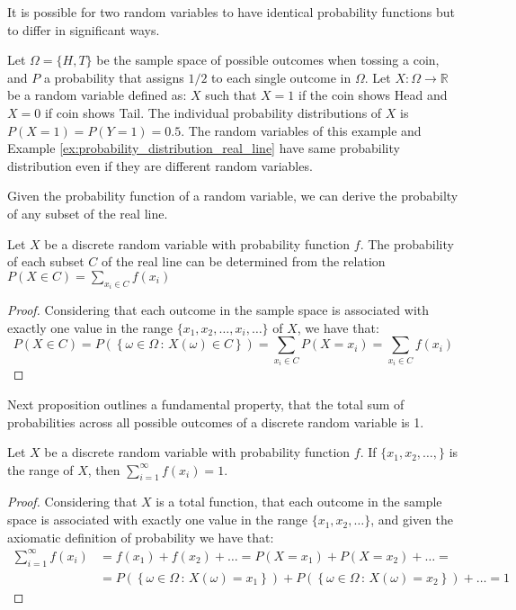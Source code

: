 It is possible for two random variables to have identical probability functions but to differ in significant ways.

\begin{example}
Let $\Omega = \{H, T\}$ be the sample space of possible outcomes when tossing a coin, and $P$ a probability that assigns $1/2$ to each single outcome in $\Omega$. Let $X: \Omega \rightarrow \mathbb{R}$ be a random variable defined as: $X$ such that $X = 1$ if the coin shows Head and $X = 0$ if coin shows Tail. The individual probability distributions of $X$ is $P(X = 1) = P(Y = 1) = 0.5$. The random variables of this example and Example \ref{ex:probability_distribution_real_line} have same probability distribution even if they are different random variables.
\end{example}

Given the probability function of a random variable, we can derive the probabilty of any subset of the real line.

\begin{proposition}
Let $X$ be a discrete random variable with probability function $f$. The probability of each subset $C$ of the real line can be determined from the relation $P\left(X\in C\right)=\sum_{x_{i}\in C}f\left(x_{i}\right)$
\end{proposition}
\begin{proof}
Considering that each outcome in the sample space is associated with exactly one value in the range $\{ x_1, x_2, \ldots, x_i, \ldots \}$ of $X$, we have that:
\[
P\left(X\in C\right) = P \left( \left\{ \omega \in \Omega \,:\, X \left( \omega \right) \in C\right\} \right) = \sum_{x_{i}\in C} P\left( X = x_i \right) = \sum_{x_{i}\in C}f\left(x_{i}\right)
\]
\end{proof}

Next proposition outlines a fundamental property, that the total sum of probabilities across all possible outcomes of a discrete random variable is 1.

\begin{proposition}
Let $X$ be a discrete random variable with probability function $f$. If $\{ x_1, x_2, \ldots, \}$ is the range of $X$, then $\sum_{i=1}^{\infty}f\left(x_{i}\right)=1$.
\end{proposition}
\begin{proof}
Considering that $X$ is a total function, that each outcome in the sample space is associated with exactly one value in the range $\{ x_1, x_2, \ldots \}$, and given the axiomatic definition of probability we have that:
\begin{equation*}
\begin{split}
\sum_{i=1}^{\infty} f(x_i) & = f(x_1) + f(x_2) + \ldots = P\left( X = x_1 \right) + P\left( X = x_2 \right) + \ldots = \\
&  = P \left( \left\{ \omega \in \Omega \,:\, X \left( \omega \right) = x_1 \right\} \right) + P \left( \left\{ \omega \in \Omega \,:\, X \left( \omega \right) = x_2 \right\} \right) + \ldots = 1 
\end{split}
\end{equation*}
\end{proof}

